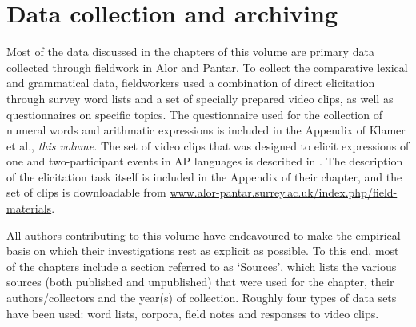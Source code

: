\section{Data collection and archiving}\label{sec:1:8}

Most of the data discussed in the chapters of this volume are primary data collected through fieldwork in Alor and Pantar. To collect the comparative lexical and grammatical data, fieldworkers used a combination of direct elicitation through survey word lists and a set of specially prepared video clips, as well as questionnaires on specific topics. The questionnaire used for the collection of numeral words and arithmatic expressions is included in the Appendix of Klamer et al., \textit{this volume.} The set of video clips that was designed to elicit expressions of one and two-participant events in AP languages is described in \citet{FeddenEtAlTV}. The description of the elicitation task itself is included in the Appendix of their chapter, and the set of clips is downloadable from \url{www.alor-pantar.surrey.ac.uk/index.php/field-materials}.

All authors contributing to this volume have endeavoured to make the empirical basis on which their investigations rest as explicit as possible. To this end, most of the chapters include a section referred to as `Sources', which lists the various sources (both published and unpublished) that were used for the chapter, their authors/collectors and the year(s) of collection. Roughly four types of data sets have been used: word lists, corpora, field notes and responses to video clips. 

